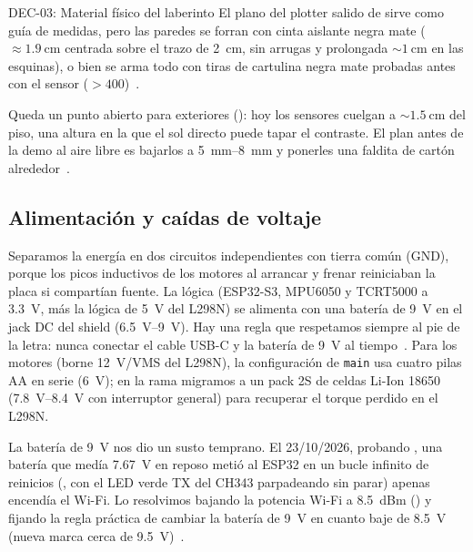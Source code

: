\begin{decision}{DEC-03: Material físico del laberinto}
  El plano del plotter salido de  sirve como guía de medidas, pero las paredes se forran con cinta aislante negra mate ($\approx\SI{1.9}{\centi\meter}$ centrada sobre el trazo de \SI{2}{\centi\meter}, sin arrugas y prolongada $\sim\SI{1}{\centi\meter}$ en las esquinas), o bien se arma todo con tiras de cartulina negra mate probadas antes con el sensor ($> 400$)~\cite{arquitectura2026doc}.
  \par\smallskip
  Queda un punto abierto para exteriores (): hoy los sensores cuelgan a $\sim\SI{1.5}{\centi\meter}$ del piso, una altura en la que el sol directo puede tapar el contraste. El plan antes de la demo al aire libre es bajarlos a \SIrange{5}{8}{\milli\meter} y ponerles una faldita de cartón alrededor~\cite{arquitectura2026doc}.
\end{decision}

\subsection{Alimentación y caídas de voltaje}
\label{subsec:alimentacion}

Separamos la energía en dos circuitos independientes con tierra común (GND), porque los picos inductivos de los motores al arrancar y frenar reiniciaban la placa si compartían fuente. La lógica (ESP32-S3, MPU6050 y TCRT5000 a \SI{3.3}{\volt}, más la lógica de \SI{5}{\volt} del L298N) se alimenta con una batería de \SI{9}{\volt} en el jack DC del shield (\SIrange{6.5}{9}{\volt}). Hay una regla que respetamos siempre al pie de la letra: nunca conectar el cable USB-C y la batería de \SI{9}{\volt} al tiempo~\cite{handoff2026doc}. Para los motores (borne \SI{12}{\volt}/VMS del L298N), la configuración de \texttt{main} usa cuatro pilas AA en serie (\SI{6}{\volt}); en la rama  migramos a un pack 2S de celdas Li-Ion 18650 (\SIrange{7.8}{8.4}{\volt} con interruptor general) para recuperar el torque perdido en el L298N.

La batería de \SI{9}{\volt} nos dio un susto temprano. El 23/10/2026, probando , una batería que medía \SI{7.67}{\volt} en reposo metió al ESP32 en un bucle infinito de reinicios (, con el LED verde TX del CH343 parpadeando sin parar) apenas encendía el Wi-Fi. Lo resolvimos bajando la potencia Wi-Fi a \SI{8.5}{dBm} () y fijando la regla práctica de cambiar la batería de \SI{9}{\volt} en cuanto baje de \SI{8.5}{\volt} (nueva marca cerca de \SI{9.5}{\volt})~\cite{arquitectura2026doc}.

